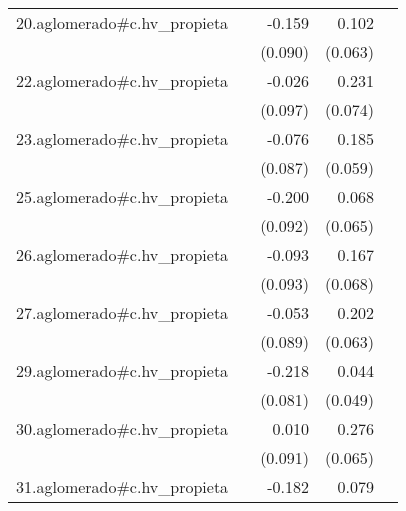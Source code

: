 {\begin{longtable}{l*{4}{D{.}{.}{-1}}}
\addlinespace
20.aglomerado#c.hv\_propieta&                     &      -0.159         &       0.102         &                     \\
            &                     &     (0.090)         &     (0.063)         &                     \\
\addlinespace
22.aglomerado#c.hv\_propieta&                     &      -0.026         &       0.231\sym{**} &                     \\
            &                     &     (0.097)         &     (0.074)         &                     \\
\addlinespace
23.aglomerado#c.hv\_propieta&                     &      -0.076         &       0.185\sym{**} &                     \\
            &                     &     (0.087)         &     (0.059)         &                     \\
\addlinespace
25.aglomerado#c.hv\_propieta&                     &      -0.200\sym{*}  &       0.068         &                     \\
            &                     &     (0.092)         &     (0.065)         &                     \\
\addlinespace
26.aglomerado#c.hv\_propieta&                     &      -0.093         &       0.167\sym{*}  &                     \\
            &                     &     (0.093)         &     (0.068)         &                     \\
\addlinespace
27.aglomerado#c.hv\_propieta&                     &      -0.053         &       0.202\sym{**} &                     \\
            &                     &     (0.089)         &     (0.063)         &                     \\
\addlinespace
29.aglomerado#c.hv\_propieta&                     &      -0.218\sym{**} &       0.044         &                     \\
            &                     &     (0.081)         &     (0.049)         &                     \\
\addlinespace
30.aglomerado#c.hv\_propieta&                     &       0.010         &       0.276\sym{***}&                     \\
            &                     &     (0.091)         &     (0.065)         &                     \\
\addlinespace
31.aglomerado#c.hv\_propieta&                     &      -0.182         &       0.079         &                     \\

\end{longtable}}
